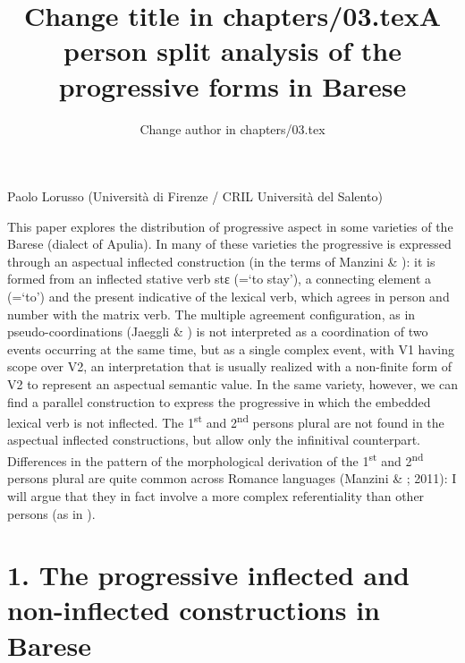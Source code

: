 \documentclass[output=paper]{langsci/langscibook}
\author{Change author in chapters/03.tex}
\title{Change title in chapters/03.tex}
\begin{document}
\title{A person split analysis of the progressive forms in Barese}

 

 

 

 

Paolo Lorusso (Università di Firenze / CRIL Università del Salento)

\begin{stylelsAbstract}
This paper explores the distribution of progressive aspect in some varieties of the Barese (dialect of Apulia). In many of these varieties the progressive is expressed through an aspectual inflected construction (in the terms of Manzini \& \citealt{Savoia2005}): it is formed from an inflected stative verb stɛ (=‘to stay’), a connecting element a (=‘to’) and the present indicative of the lexical verb, which agrees in person and number with the matrix verb. The multiple agreement configuration, as in pseudo{}-coordinations (Jaeggli \& \citealt{Hyams1993}) is not interpreted as a coordination of two events occurring at the same time, but as a single complex event, with V1 having scope over V2, an interpretation that is usually realized with a non-finite form of V2 to represent an aspectual semantic value. In the same variety, however, we can find a parallel construction to express the progressive in which the embedded lexical verb is not inflected. The 1\textsuperscript{st} and 2\textsuperscript{nd} persons plural are not found in the aspectual inflected constructions, but allow only the infinitival counterpart. Differences in the pattern of the morphological derivation of the 1\textsuperscript{st} and 2\textsuperscript{nd} persons plural are quite common across Romance languages (Manzini \& \citealt{Savoia2005}; 2011): I will argue that they in fact involve a more complex referentiality than other persons (as in \citealt{Bobalijk2008}). 
\end{stylelsAbstract}

\section{ 1. The progressive inflected and non-inflected constructions in Barese}
\end{document}
